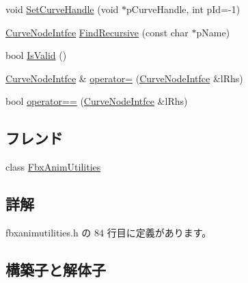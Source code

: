 \begin{DoxyCompactItemize}
void \hyperlink{class_fbx_anim_utilities_1_1_curve_node_intfce_ae85136906c93fa6354ea8bedfd4529f3}{Set\+Curve\+Handle} (void $\ast$p\+Curve\+Handle, int p\+Id=-\/1)
\item 
\hyperlink{class_fbx_anim_utilities_1_1_curve_node_intfce}{Curve\+Node\+Intfce} \hyperlink{class_fbx_anim_utilities_1_1_curve_node_intfce_a569764d9e78475b8742595ea7865c3e3}{Find\+Recursive} (const char $\ast$p\+Name)
\item 
bool \hyperlink{class_fbx_anim_utilities_1_1_curve_node_intfce_aa8a503d6101b62e96c17366ed35fedfd}{Is\+Valid} ()
\item 
\hyperlink{class_fbx_anim_utilities_1_1_curve_node_intfce}{Curve\+Node\+Intfce} \& \hyperlink{class_fbx_anim_utilities_1_1_curve_node_intfce_a3f44f01d0df459b322ef34607b41d792}{operator=} (\hyperlink{class_fbx_anim_utilities_1_1_curve_node_intfce}{Curve\+Node\+Intfce} \&l\+Rhs)
\item 
bool \hyperlink{class_fbx_anim_utilities_1_1_curve_node_intfce_a705d0c9ec97ebcdeb6bb01375ba5cc5b}{operator==} (\hyperlink{class_fbx_anim_utilities_1_1_curve_node_intfce}{Curve\+Node\+Intfce} \&l\+Rhs)
\end{DoxyCompactItemize}
\subsection*{フレンド}
\begin{DoxyCompactItemize}
\item 
class \hyperlink{class_fbx_anim_utilities_1_1_curve_node_intfce_aeacafd3baeb97bc8863c00bb6de0073d}{Fbx\+Anim\+Utilities}
\end{DoxyCompactItemize}


\subsection{詳解}


 fbxanimutilities.\+h の 84 行目に定義があります。



\subsection{構築子と解体子}
\mbox{\label{class_fbx_anim_utilities_1_1_curve_node_intfce_a6f3f8be16037c0e517ca91580c2babad}} 
